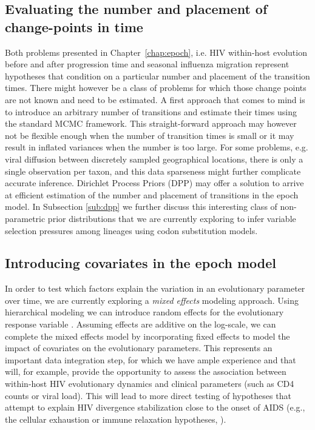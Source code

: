 \subsection{Evaluating the number and placement of change-points in time}

Both problems presented in Chapter~\ref{chap:epoch}, i.e. HIV within-host evolution before and after progression time and seasonal influenza migration represent hypotheses that condition on a particular number and placement of the transition times.
There might however be a class of problems for which those change points are not known and need to be estimated.
A first approach that comes to mind is to introduce an arbitrary number of transitions and estimate their times using the standard MCMC framework.
This straight-forward approach may however not be flexible enough when the number of transition times is small or it may result in
inflated variances when the number is too large. For some problems, e.g. viral diffusion between discretely sampled geographical locations, there is only a single observation per taxon, and this data sparseness might further complicate accurate inference.
Dirichlet Process Priors (DPP) may offer a solution to arrive at efficient estimation of the number and placement of transitions in the epoch model. 
In Subsection \ref{sub:dpp} we further discuss this interesting class of non-parametric prior distributions that we are currently exploring to infer variable selection pressures among lineages using codon substitution models.

\subsection{Introducing covariates in the epoch model}

In order to test which factors explain the variation in an evolutionary parameter over time, we are currently exploring a \emph{mixed effects} modeling approach. 
Using hierarchical modeling we can introduce random effects for the evolutionary response variable \citep{Edo-Matas2011}.
Assuming effects are additive on the log-scale, we can complete the mixed effects model by incorporating fixed effects to model the impact of covariates on the evolutionary parameters. 
This represents an important data integration step, for which we have ample experience \citep{Edo-Matas2011,Streicker2012,Vrancken2014} and that will, for example, provide the opportunity to assess the association between within-host HIV evolutionary dynamics and clinical parameters (such as CD4 counts or viral load). 
This will lead to more direct testing of hypotheses that attempt to explain HIV divergence stabilization close to the onset of AIDS (e.g., the cellular exhaustion or immune relaxation hypotheses, \citep{Lemey2007}).

